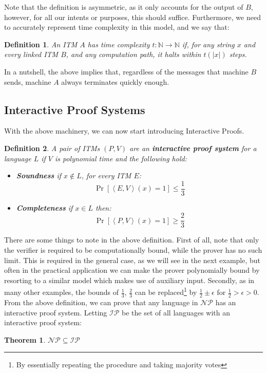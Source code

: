 \documentclass{article}
\newtheorem{theorem}{Theorem}
\newtheorem{definition}{Definition}
\begin{document}
Note that the definition is asymmetric, as it only accounts for the output of $B$, however, for all our intents or purposes, this should suffice. 
Furthermore, we need to accurately represent time complexity in this model, and we say that:

\begin{definition}
An ITM $A$ has time complexity $t: \mathbb{N} \to \mathbb{N}$ if, for any string $x$ and every linked ITM $B$, and any computation path, it halts within $t(|x|)$ steps. 
\end{definition}

In a nutshell, the above implies that, regardless of the messages that machine $B$ sends, machine $A$ always terminates quickly enough. 

\subsection{Interactive Proof Systems}
With the above machinery, we can now start introducing Interactive Proofs. 
\begin{definition}
A pair of ITMs $(P, V)$ are an \textbf{interactive proof system} for a language $L$ if $V$ is polynomial time and the following hold:
\begin{itemize}
    \item \textbf{Soundness} if $x \notin L$, for every ITM $E$:
        \[ \Pr[\left<E,V \right>(x) = 1] \leq \frac{1}{3} \]
    \item \textbf{Completeness} if $x \in L$ then:
        \[ \Pr[\left<P, V\right>(x) = 1 ] \geq \frac{2}{3}\]
\end{itemize}
\end{definition}
There are some things to note in the above definition. First of all, note that only the verifier is required to be computationally bound, while the prover has no such limit. This is required in the general case, as we will see in the next example, but often in the practical application we can make the prover polynomially bound by resorting to a similar model which makes use of auxiliary input. Secondly, as in many other examples, the bounds of $\frac{1}{3}$, $\frac{2}{3}$ can be replaced\footnote{By essentially repeating the procedure and taking majority votes} by $\frac{1}{2} \pm \epsilon$ for $\frac{1}{2} > \epsilon > 0$. From the above definition, we can prove that any language in $\mathcal{NP}$ has an interactive proof system. Letting $\mathcal{IP}$ be the set of all languages with an interactive proof system:
\begin{theorem}
$\mathcal{NP} \subseteq \mathcal{IP}$ 
\end{theorem}
\end{document}
